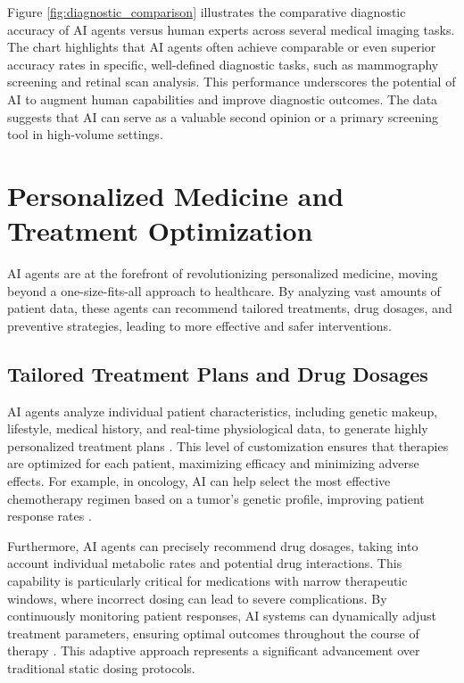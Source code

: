 \documentclass[12pt,a4paper]{article}
\begin{document}
Figure \ref{fig:diagnostic_comparison} illustrates the comparative diagnostic accuracy of AI agents versus human experts across several medical imaging tasks. The chart highlights that AI agents often achieve comparable or even superior accuracy rates in specific, well-defined diagnostic tasks, such as mammography screening and retinal scan analysis. This performance underscores the potential of AI to augment human capabilities and improve diagnostic outcomes. The data suggests that AI can serve as a valuable second opinion or a primary screening tool in high-volume settings.

\section{Personalized Medicine and Treatment Optimization}
\label{sec:personalized_medicine}
AI agents are at the forefront of revolutionizing personalized medicine, moving beyond a one-size-fits-all approach to healthcare. By analyzing vast amounts of patient data, these agents can recommend tailored treatments, drug dosages, and preventive strategies, leading to more effective and safer interventions.

\subsection{Tailored Treatment Plans and Drug Dosages}
\label{sec:tailored_treatments}
AI agents analyze individual patient characteristics, including genetic makeup, lifestyle, medical history, and real-time physiological data, to generate highly personalized treatment plans \cite{shah2019artificial}. This level of customization ensures that therapies are optimized for each patient, maximizing efficacy and minimizing adverse effects. For example, in oncology, AI can help select the most effective chemotherapy regimen based on a tumor's genetic profile, improving patient response rates \cite{ibm_watson_health}.

Furthermore, AI agents can precisely recommend drug dosages, taking into account individual metabolic rates and potential drug interactions. This capability is particularly critical for medications with narrow therapeutic windows, where incorrect dosing can lead to severe complications. By continuously monitoring patient responses, AI systems can dynamically adjust treatment parameters, ensuring optimal outcomes throughout the course of therapy \cite{saito2015precision}. This adaptive approach represents a significant advancement over traditional static dosing protocols.
\end{document}
